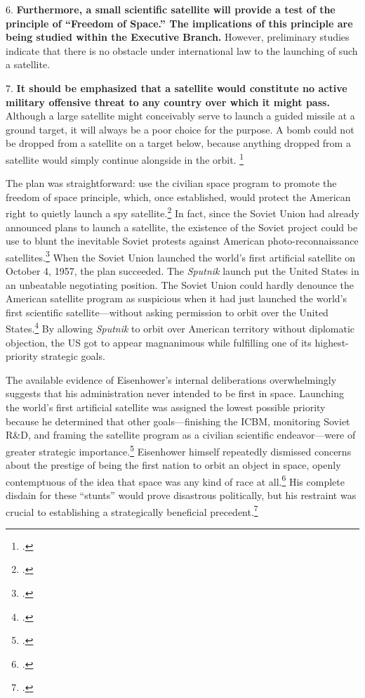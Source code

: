 \documentclass[12pt]{extarticle}
\begin{document}
\begin{quoteblock}
6. \textelp{} \textbf{Furthermore, a small scientific satellite will provide a test of the principle of “Freedom of Space.” The implications of this principle are being studied within the Executive Branch.} However, preliminary studies indicate that there is no obstacle under international law to the launching of such a satellite.

7. \textbf{It should be emphasized that a satellite would constitute no active military offensive threat to any country over which it might pass.} Although a large satellite might conceivably serve to launch a guided missile at a ground target, it will always be a poor choice for the purpose. A bomb could not be dropped from a satellite on a target below, because anything dropped from a satellite would simply continue alongside in the orbit. \footcite{nsc_planning_board_draft_1955}
\newline
\end{quoteblock}

The plan was straightforward: use the civilian space program to promote the freedom of space principle, which, once established, would protect the American right to quietly launch a spy satellite.\footcite[119]{day_eye_2015} In fact, since the Soviet Union had already announced plans to launch a satellite, the existence of the Soviet project could be use to blunt the inevitable Soviet protests against American photo-reconnaissance satellites.\footcite[120]{mcdougall_heavens_1985} When the Soviet Union launched the world's first artificial satellite on October 4, 1957, the plan succeeded. The \emph{Sputnik} launch put the United States in an unbeatable negotiating position. The Soviet Union could hardly denounce the American satellite program as suspicious when it had just launched the world's first scientific satellite---without asking permission to orbit over the United States.\footcite[40]{peebles_corona_1997} By allowing \emph{Sputnik} to orbit over American territory without diplomatic objection, the US got to appear magnanimous while fulfilling one of its highest-priority strategic goals.

The available evidence of Eisenhower's internal deliberations overwhelmingly suggests that his administration never intended to be first in space. Launching the world's first artificial satellite was assigned the lowest possible priority because he determined that other goals---finishing the ICBM, monitoring Soviet R\&D, and framing the satellite program as a civilian scientific endeavor---were of greater strategic importance.\footcite[123-124]{mcdougall_heavens_1985} Eisenhower himself repeatedly dismissed concerns about the prestige of being the first nation to orbit an object in space, openly contemptuous of the idea that space was any kind of race at all.\footcite[100]{lindgren_trust_2000} His complete disdain for these ``stunts'' would prove disastrous politically, but his restraint was crucial to establishing a strategically beneficial precedent.\footcite[134]{day_eye_2015}
\end{document}
